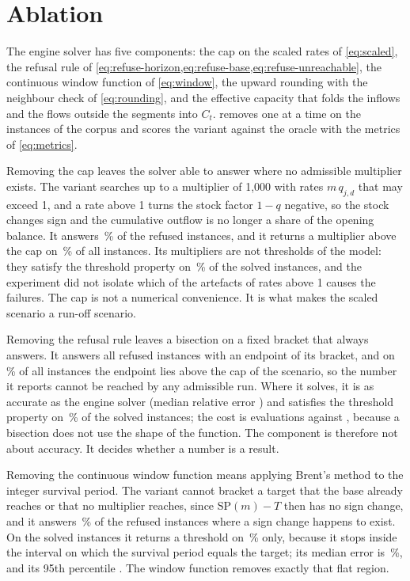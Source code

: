 \section{Ablation}
\label{sec:ablation}

The engine solver has five components: the cap on the scaled rates of \cref{eq:scaled}, the refusal rule of \cref{eq:refuse-horizon,eq:refuse-base,eq:refuse-unreachable}, the continuous window function of \cref{eq:window}, the upward rounding with the neighbour check of \cref{eq:rounding}, and the effective capacity that folds the inflows and the flows outside the segments into $C_t$.  removes one at a time on the \kInst{} instances of the corpus and scores the variant against the oracle with the metrics of \cref{eq:metrics}.



Removing the cap leaves the solver able to answer where no admissible multiplier exists. The variant searches up to a multiplier of 1,000 with rates $m\,q_{j,d}$ that may exceed 1, and a rate above 1 turns the stock factor $1-q$ negative, so the stock changes sign and the cumulative outflow is no longer a share of the opening balance. It answers \kUFalse{}\,\% of the refused instances, and it returns a multiplier above the cap on \kUBeyond{}\,\% of all instances. Its multipliers are not thresholds of the model: they satisfy the threshold property on \kUThr{}\,\% of the solved instances, and the experiment did not isolate which of the artefacts of rates above 1 causes the failures. The cap is not a numerical convenience. It is what makes the scaled scenario a run-off scenario.

Removing the refusal rule leaves a bisection on a fixed bracket that always answers. It answers all \kRefused{} refused instances with an endpoint of its bracket, and on \kNBeyond{}\,\% of all instances the endpoint lies above the cap of the scenario, so the number it reports cannot be reached by any admissible run. Where it solves, it is as accurate as the engine solver (median relative error \kNErr{}) and satisfies the threshold property on \kNThr{}\,\% of the solved instances; the cost is \kNEvals{} evaluations against \kPEvals{}, because a bisection does not use the shape of the function. The component is therefore not about accuracy. It decides whether a number is a result.

Removing the continuous window function means applying Brent's method to the integer survival period. The variant cannot bracket a target that the base already reaches or that no multiplier reaches, since $\mathrm{SP}(m)-T$ then has no sign change, and it answers \kBFalse{}\,\% of the refused instances where a sign change happens to exist. On the solved instances it returns a threshold on \kBThr{}\,\% only, because it stops inside the interval on which the survival period equals the target; its median error is \kBErrPc{}\,\%, and its 95th percentile \kBErrQ{}. The window function removes exactly that flat region.

